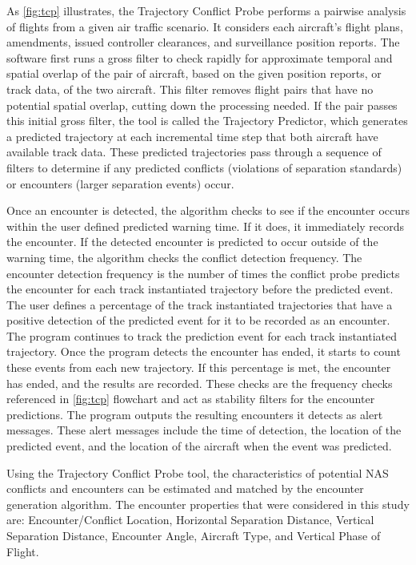 As \ref{fig:tcp} illustrates, the Trajectory Conflict Probe performs a pairwise analysis of flights from a given air traffic scenario. It considers each aircraft's flight plans, amendments, issued controller clearances, and surveillance position reports. The software first runs a gross filter to check rapidly for approximate temporal and spatial overlap of the pair of aircraft, based on the given position reports, or track data, of the two aircraft. This filter removes flight pairs that have no potential spatial overlap, cutting down the processing needed. If the pair passes this initial gross filter, the tool is called the Trajectory Predictor, which generates a predicted trajectory at each incremental time step that both aircraft have available track data. These predicted trajectories pass through a sequence of filters to determine if any predicted conflicts (violations of separation standards) or encounters (larger separation events) occur. 

Once an encounter is detected, the algorithm checks to see if the encounter occurs within the user defined predicted warning time. If it does, it immediately records the encounter. If the detected encounter is predicted to occur outside of the warning time, the algorithm checks the conflict detection frequency. The encounter detection frequency is the number of times the conflict probe predicts the encounter for each track instantiated trajectory before the predicted event. The user defines a percentage of the track instantiated trajectories that have a positive detection of the predicted event for it to be recorded as an encounter. The program continues to track the prediction event for each track instantiated trajectory. Once the program detects the encounter has ended, it starts to count these events from each new trajectory. If this percentage is met, the encounter has ended, and the results are recorded. These checks are the frequency checks referenced in \ref{fig:tcp} flowchart and act as stability filters for the encounter predictions. The program outputs the resulting encounters it detects as alert messages. These alert messages include the time of detection, the location of the predicted event, and the location of the aircraft when the event was predicted.

Using the Trajectory Conflict Probe tool, the characteristics of potential NAS conflicts and encounters can be estimated and matched by the encounter generation algorithm. The encounter properties that were considered in this study are: Encounter/Conflict Location, Horizontal Separation Distance, Vertical Separation Distance, Encounter Angle, Aircraft Type, and Vertical Phase of Flight.

